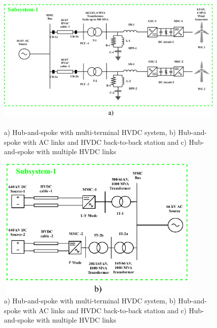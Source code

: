 \begin{figure}[H]
\centering
    \includegraphics[height = 7cm,width = 13cm]{Diagrams/Chapter_4/WT2_scaling.pdf}
    \caption{a) Hub-and-spoke with multi-terminal HVDC system, b) Hub-and-spoke with AC links and HVDC back-to-back station and c) Hub-and-spoke with multiple HVDC links \cite{abb_hvdc_2018}}
    \label{fig:ABB_Hub_Spoke_3}
\end{figure}

\begin{figure}[H]
\centering
    \includegraphics[height = 7cm,width = 10cm]{Diagrams/Chapter_4/MMC2_scaling.pdf}
    \caption{a) Hub-and-spoke with multi-terminal HVDC system, b) Hub-and-spoke with AC links and HVDC back-to-back station and c) Hub-and-spoke with multiple HVDC links \cite{abb_hvdc_2018}}
    \label{fig:ABB_Hub_Spoke_3}
\end{figure}

